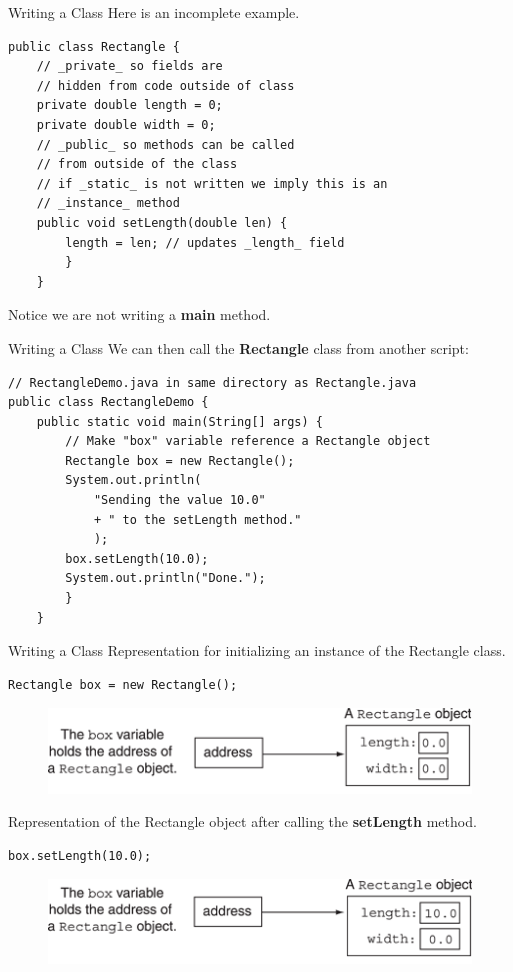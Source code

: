 \documentclass[11pt]{beamer}
\begin{document}
\begin{frame}[fragile]{Writing a Class}
Here is an incomplete example.
    \begin{lstlisting}
public class Rectangle {
    // _private_ so fields are
    // hidden from code outside of class
    private double length = 0;
    private double width = 0;
    // _public_ so methods can be called
    // from outside of the class
    // if _static_ is not written we imply this is an
    // _instance_ method
    public void setLength(double len) {
        length = len; // updates _length_ field
        }
    }
    \end{lstlisting}
Notice we are not writing a \textbf{main} method.
\end{frame}

\begin{frame}[fragile]{Writing a Class}
We can then call the \textbf{Rectangle} class from another script:
    \begin{lstlisting}
// RectangleDemo.java in same directory as Rectangle.java
public class RectangleDemo {
    public static void main(String[] args) {
        // Make "box" variable reference a Rectangle object
        Rectangle box = new Rectangle();
        System.out.println(
            "Sending the value 10.0"
            + " to the setLength method."
            );
        box.setLength(10.0);
        System.out.println("Done.");
        }	
    }
    \end{lstlisting}
\end{frame}

\begin{frame}[fragile]{Writing a Class}
\footnotesize
Representation for initializing an instance of the Rectangle class.
    \begin{lstlisting}
Rectangle box = new Rectangle();
    \end{lstlisting}
    \noindent 
    \begin{figure}[H]
    \centering
    \includegraphics[scale=0.9]{Images/chapter06_InitRectangle.png}
    \end{figure}
Representation of the Rectangle object after calling the \textbf{setLength} method.
    \begin{lstlisting}
box.setLength(10.0);
    \end{lstlisting}
    \noindent 
    \begin{figure}[H]
    \centering
    \includegraphics[scale=0.9]{Images/chapter06_ValueRectangle.png}
    \end{figure}
\end{frame}
\end{document}
